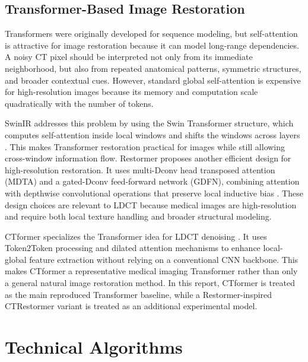 \documentclass[journal]{IEEEtran}
\begin{document}
\subsection{Transformer-Based Image Restoration}
Transformers were originally developed for sequence modeling, but self-attention is attractive for image restoration because it can model long-range dependencies. A noisy CT pixel should be interpreted not only from its immediate neighborhood, but also from repeated anatomical patterns, symmetric structures, and broader contextual cues. However, standard global self-attention is expensive for high-resolution images because its memory and computation scale quadratically with the number of tokens.

SwinIR addresses this problem by using the Swin Transformer structure, which computes self-attention inside local windows and shifts the windows across layers \cite{liang2021swinir}. This makes Transformer restoration practical for images while still allowing cross-window information flow. Restormer proposes another efficient design for high-resolution restoration. It uses multi-Dconv head transposed attention (MDTA) and a gated-Dconv feed-forward network (GDFN), combining attention with depthwise convolutional operations that preserve local inductive bias \cite{zamir2022restormer}. These design choices are relevant to LDCT because medical images are high-resolution and require both local texture handling and broader structural modeling.

CTformer specializes the Transformer idea for LDCT denoising \cite{wang2023ctformer}. It uses Token2Token processing and dilated attention mechanisms to enhance local-global feature extraction without relying on a conventional CNN backbone. This makes CTformer a representative medical imaging Transformer rather than only a general natural image restoration method. In this report, CTformer is treated as the main reproduced Transformer baseline, while a Restormer-inspired CTRestormer variant is treated as an additional experimental model.

\section{Technical Algorithms}
\end{document}
